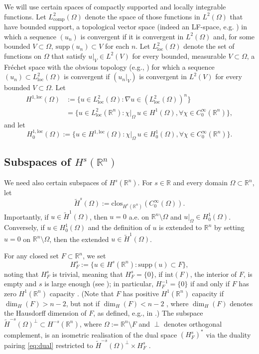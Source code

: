 \documentclass{birkjour}
\theoremstyle{definition}
\theoremstyle{remark}
\numberwithin{equation}{section}
\newcommand{\R}{\mathbb{R}}
\newcommand{\Lloc}{L^{2}_{\mathrm{loc}}}
\newcommand{\Lcomp}{L^{2}_{\mathrm{comp}}}
\newcommand{\supp}{\mathrm{supp}}
\begin{document}
 We will use  certain spaces of compactly supported and locally integrable functions. Let $\Lcomp(\Omega)$ denote the space of those functions in $L^2(\Omega)$ that have bounded support, a topological vector space (indeed an LF-space, e.g. \cite{Treves67}) in which a sequence $(u_n)$ is convergent if it is convergent in $L^2(\Omega)$ and, for some bounded $V\subset \Omega$, $\supp(u_n)\subset V$ for each $n$. Let $\Lloc(\Omega)$ denote the set of functions on $\Omega$ that satisfy $u|_V\in L^2(V)$ for every bounded, measurable $V\subset \Omega$, a Fr\'echet space with the obvious topology (e.g., \cite[p.~52]{wilcox1975}) for which a sequence $(u_n)\subset \Lloc(\Omega)$ is convergent if $(u_n|_V)$ is convergent in $L^2(V)$ for every bounded $V\subset \Omega$. Let 
\begin{align*}
 H^{1,\text{loc}}(\Omega)&:= \{u\in \Lloc(\Omega):\nabla u\in (\Lloc(\Omega))^n\}\\ &=\{u\in \Lloc(\R^n): \chi|_\Omega \,u\in H^1(\Omega), \forall \chi\in C^\infty_0(\R^n)\},
\end{align*} 
and let
$$
H_0^{1,\text{loc}}(\Omega):=\{u\in H^{1,\text{loc}}(\Omega): \chi|_\Omega\, u\in H_0^1(\Omega), \forall \chi\in C^\infty_0(\mathbb{R}^n)\}.
$$
  
 \subsection{Subspaces of $H^s(\R^n)$} \label{sec:sub}
We need also certain subspaces of $H^s(\R^n)$. For $s\in\mathbb{R}$ and every domain $\Omega\subset \R^n$, let  
 $$
 \widetilde{H}^s(\Omega):=\text{clos}_{H^s(\R^n)}(C^{\infty}_0(\Omega)).
 $$ 
 Importantly, if $u\in \widetilde{H}^1(\Omega)$, then $u=0$ a.e. on $\mathbb{R}^n\setminus\Omega$ and $u|_\Omega\in H_0^1(\Omega)$. Conversely, if $u\in H_0^1(\Omega)$ and the definition of $u$ is extended to $\R^n$ by setting $u=0$ on $\R^n\setminus \Omega$, then the extended $u\in \widetilde H^1(\Omega)$. 
 
 For any closed set $F\subset\mathbb{R}^n$, we set
\begin{equation*}
H^s_F:=\{u\in H^s(\mathbb{R}^n): \text{supp}(u)\subset F\},
\end{equation*}
noting that $H^s_F$ is trivial, meaning that $H^s_F=\{0\}$, if $\mathrm{int}(F)$, the interior of $F$, is empty and $s$ is large enough (see \cite{HeMo:16}); in particular, $H^{-1}_F=\{0\}$ if and only if $F$ has zero $H^1(\R^n)$ capacity \cite[Thm.~3.15]{HeMo:16}. (Note that  $F$ has positive $H^1(\R^n)$ capacity if $\dim_H(F)>n-2$, but not if $\dim_H(F)<n-2$ \cite[Thm.~2.12]{HeMo:16}, where $\dim_H(F)$ denotes the Hausdorff dimension of $F$, as defined,  e.g., in  \cite{Falconer2014}.) The subspace $\widetilde H^{-s}(\Omega)^\perp \subset H^{-s}(\R^n)$, where $\Omega:=\R^n\setminus F$ and $\perp$ denotes orthogonal complement, is an isometric realisation of the dual space $(H^s_F)^*$ via the duality pairing \eqref{eq:dual} restricted to $\widetilde H^{-s}(\Omega)^\perp \times H^s_F$ \cite[Thm.~3.15]{ChHeMo:17}. 
\end{document}

